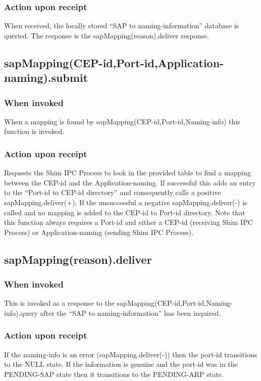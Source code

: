 \subsubsection{Action upon receipt}
When received, the locally stored ``SAP to naming-information'' database is queried. The response is the sapMapping(reason).deliver response.

\subsection{sapMapping(CEP-id,Port-id,Application-naming).submit}
\subsubsection{When invoked}
When a mapping is found by sapMapping(CEP-id,Port-id,Naming-info) this function is invoked.
\subsubsection{Action upon receipt} 
Requests the Shim IPC Process to look in the provided table to find a mapping between the CEP-id and the Application-naming. If successful this adds an entry to the ``Port-id to CEP-id directory'' and consequently calls a positive sapMapping.deliver(+). If the unsuccessful a negative sapMapping.deliver(-) is called and no mapping is added to the CEP-id to Port-id directory. Note that this function always requires a Port-id and either a CEP-id (receiving Shim IPC Process) or Application-naming (sending Shim IPC Process). 

\subsection{sapMapping(reason).deliver}
\subsubsection{When invoked}
This is invoked as a response to the sapMapping(CEP-id,Port-id,Naming-info).query after the ``SAP to naming-information'' has been inquired. 
\subsubsection{Action upon receipt}
If the naming-info is an error (sapMapping.deliver(-)) then the port-id transitions to the NULL state. If the information is genuine and the port-id was in the PENDING-SAP state then it transitions to the PENDING-ARP state. 

